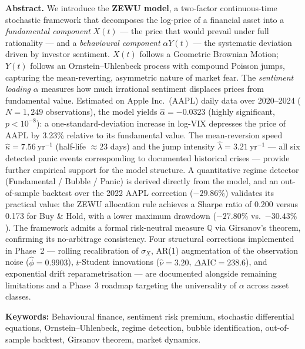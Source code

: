 \documentclass[12pt,a4paper]{article}
\theoremstyle{definition}
\theoremstyle{remark}
\newcommand{\Q}{\mathbb{Q}}
\begin{document}
\begin{titlepage}
\begin{center}
    \begin{mdframed}[backgroundcolor=zewulight,linecolor=zewublue,
                     linewidth=1pt,innerleftmargin=12pt,
                     innerrightmargin=12pt,innertopmargin=10pt,
                     innerbottommargin=10pt]
    \textbf{Abstract.}
    We introduce the \textbf{ZEWU model}, a two-factor continuous-time
    stochastic framework that decomposes the log-price of a financial asset
    into a \emph{fundamental component} $X(t)$ --- the price that would
    prevail under full rationality --- and a \emph{behavioural component}
    $\alpha Y(t)$ --- the systematic deviation driven by investor sentiment.
    $X(t)$ follows a Geometric Brownian Motion; $Y(t)$ follows an
    Ornstein--Uhlenbeck process with compound Poisson jumps, capturing
    the mean-reverting, asymmetric nature of market fear. The \emph{sentiment
    loading} $\alpha$ measures how much irrational sentiment displaces prices
    from fundamental value. Estimated on Apple Inc.\ (AAPL) daily data
    over 2020--2024 ($N = 1{,}249$ observations), the model yields
    $\hat{\alpha} = -0.0323$ (highly significant, $p < 10^{-8}$): a
    one-standard-deviation increase in log-VIX depresses the price of AAPL
    by 3.23\% relative to its fundamental value. The mean-reversion speed
    $\hat{\kappa} = 7.56~\text{yr}^{-1}$ (half-life $\approx 23$ days)
    and the jump intensity $\hat{\lambda} = 3.21~\text{yr}^{-1}$ --- all six
    detected panic events corresponding to documented historical crises ---
    provide further empirical support for the model structure. A
    quantitative regime detector (Fundamental / Bubble / Panic) is
    derived directly from the model, and an out-of-sample backtest over
    the 2022 AAPL correction ($-29.86\%$) validates its practical value:
    the ZEWU allocation rule achieves a Sharpe ratio of 0.200 versus 0.173
    for Buy \& Hold, with a lower maximum drawdown ($-27.80\%$ vs.\
    $-30.43\%$). The framework admits a formal risk-neutral measure $\Q$
    via Girsanov's theorem, confirming its no-arbitrage consistency.
    Four structural corrections implemented in Phase~2 --- rolling
    recalibration of $\sigma_X$, AR(1) augmentation of the observation
    noise ($\hat{\phi} = 0.9903$), $t$-Student innovations
    ($\hat{\nu} = 3.20$, $\Delta\text{AIC} = 238.6$), and exponential
    drift reparametrisation --- are documented alongside remaining
    limitations and a Phase~3 roadmap targeting the universality of
    $\alpha$ across asset classes.

    \vspace{6pt}
    \noindent\textbf{Keywords:} Behavioural finance, sentiment risk premium,
    stochastic differential equations, Ornstein--Uhlenbeck, regime detection,
    bubble identification, out-of-sample backtest, Girsanov theorem,
    market dynamics.


\end{mdframed}
\end{center}
\end{titlepage}
\end{document}
